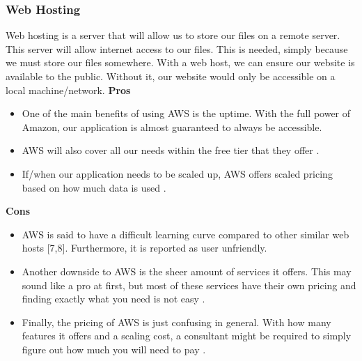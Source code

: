 \subsubsection{Web Hosting}
Web hosting is a server that will allow us to store our files on a remote server. This server will allow internet access to our files. This is needed, simply because we must store our files somewhere. With a web host, we can ensure our website is available to the public. Without it, our website would only be accessible on a local machine/network.
		\textbf{Pros}
			\begin{itemize}
				\item One of the main benefits of using AWS is the uptime. With the full power of Amazon, our application is almost guaranteed to always be accessible. 
				\item AWS will also cover all our needs within the free tier that they offer \cite{amazon}. 
				\item If/when our application needs to be scaled up, AWS offers scaled pricing based on how much data is used \cite{amazon}.
			\end{itemize}
		\textbf{Cons}
			\begin{itemize}
				\item AWS is said to have a difficult learning curve compared to other similar web hosts [7,8]. Furthermore, it is reported as user unfriendly. 
				\item Another downside to AWS is the sheer amount of services it offers. This may sound like a pro at first, but most of these services have their own pricing and finding exactly what you need is not easy \cite{aws}. 
				\item Finally, the pricing of AWS is just confusing in general. With how many features it offers and a scaling cost, a consultant might be required to simply figure out how much you will need to pay \cite{aws}.
			\end{itemize}
			
